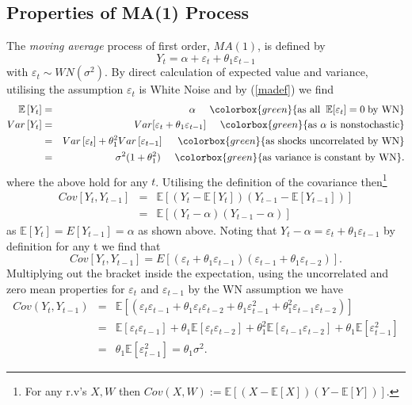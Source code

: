 \documentclass[openany]{tufte-book} %
\newcommand{\highlight}[1]{\colorbox{green}{\ensuremath{#1}}}
\begin{document}
\subsection{Properties of MA(1) Process} \label{ma1properties}
The \emph{moving average} process of first order, $MA(1)$, is defined by
\begin{equation} \label{madef}
Y_{t}=\alpha +\varepsilon_{t}+\theta_{1}\varepsilon_{t-1}
\end{equation}
with $\varepsilon_{t}\sim WN\left(\sigma ^{2}\right) $. By direct
calculation of expected value and variance, utilising the assumption $\varepsilon_t$ is White Noise and by (\ref{madef}) we find
\begin{eqnarray*}
\mathbb{E}\left[ Y_{t}\right]  &=&\alpha \;\;\;\;\;  \highlight{\textrm{as all} \;\;\mathbb{E}[\varepsilon_t]=0 \; \textrm{by WN}} \\
Var\left[ Y_{t}\right]  &=&Var[\varepsilon_{t}+\theta_{1}\varepsilon_{t-1}]\;\;\;\;\; \highlight{\textrm{as }\alpha \textrm{ is nonstochastic}} \\
&=&Var\left[ \varepsilon_{t}\right] +\theta_{1}^{2}Var%
\left[ \varepsilon_{t-1}\right] \;\;\;\;\;\highlight{\textrm{as shocks uncorrelated by WN}} \\
&=&\sigma^{2}(1+\theta_{1}^{2}) \;\;\;\;\;\highlight{\textrm{as variance is constant by WN}}.
\end{eqnarray*}
where the above hold for any $t$. Utilising the definition of the covariance then\footnote{For any r.v's $X,W$ then $Cov(X,W):=\mathbb{E}\left[(X-\mathbb{E}[X])(Y-\mathbb{E}[Y])\right]$.}
\begin{eqnarray*}
Cov\left[ Y_{t},Y_{t-1}\right]  &=&\mathbb{E}\left[ \left( Y_{t}-\mathbb{E}\left[
Y_{t}\right] \right) \left( Y_{t-1}-\mathbb{E}\left[ Y_{t-1}\right] \right) \right]
\\
&=&\mathbb{E}\left[ \left( Y_{t}-\alpha \right) \left( Y_{t-1}-\alpha \right) \right]
\end{eqnarray*}
as $\mathbb{E}[Y_t]=E[Y_{t-1}]=\alpha$ as shown above. Noting that $Y_t-\alpha=\varepsilon_t+\theta_1\varepsilon_{t-1}$ by definition for any t we find that%
\[
Cov\left[ Y_{t},Y_{t-1}\right] =E\left[ \left( \varepsilon_{t}+\theta_{1}\varepsilon_{t-1}\right) \left( \varepsilon_{t-1}+\theta_{1}\varepsilon_{t-2}\right) \right] .
\]%
Multiplying out the bracket inside the expectation, using the uncorrelated and  zero
mean properties for $\varepsilon _{t}$ and $\varepsilon _{t-1}$ by the WN assumption we have%
\begin{eqnarray*}
Cov(Y_{t},Y_{t-1}) &=& \mathbb{E}\left[(\varepsilon_{t}\varepsilon_{t-1}+\theta_{1}\varepsilon_{t}\varepsilon_{t-2}+\theta_{1}\varepsilon_{t-1}^{2}+\theta_{1}^{2}\varepsilon_{t-1}\varepsilon_{t-2})\right] \\
&=& \mathbb{E}\left[\varepsilon_{t}\varepsilon_{t-1}\right] +\theta_1\mathbb{E}\left[\varepsilon_{t}\varepsilon_{t-2}\right] + \theta_{1}^{2}\mathbb{E}\left[\varepsilon_{t-1}\varepsilon_{t-2}\right] +\theta_{1}\mathbb{E}\left[\varepsilon_{t-1}^{2}\right]\\
&=&\theta_{1}\mathbb{E}[\varepsilon_{t-1}^{2}]=\theta_{1}\sigma^{2}.
\end{eqnarray*}
\end{document}
